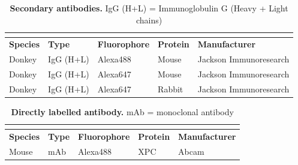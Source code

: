 \begin{table}[H]
	
\begin{center}
	\begin{tabular}{lllll}
		
		\multicolumn{5}{l}{} \\
		\hline
		\rule{0pt}{2ex}
		\textbf{Species}    &\textbf{Type} &\textbf{Fluorophore}& \textbf{Protein} & \textbf{Manufacturer} \\
		\hline
		
		Donkey & IgG (H+L) & Alexa488 & Mouse & Jackson Immunoresearch       \\
		Donkey & IgG (H+L) & Alexa647   & Mouse & Jackson Immunoresearch       \\
		Donkey & IgG (H+L) & Alexa647 & Rabbit& Jackson Immunoresearch       \\
		\hline
	\end{tabular}
	\caption{\textbf{Secondary antibodies.}  IgG (H+L) = Immunoglobulin G (Heavy + Light chains)}
	\label{tab:SecondaryAntibodies}
	\end{center}
\end{table}

\begin{table}[H]
\begin{center}
	\begin{tabular}{lllll}
		
		\multicolumn{5}{l}{} \\
		\hline
		\rule{0pt}{2ex}
		\textbf{Species}    &\textbf{Type} &\textbf{Fluorophore}& \textbf{Protein} & \textbf{Manufacturer} \\
		\hline
		Mouse & mAb & Alexa488 & XPC & Abcam       \\
		\hline
	\end{tabular}
	\caption{\textbf{Directly labelled antibody.}  mAb = monoclonal antibody}
	\label{tab:DirectlyLabeledAntibody}
	\end{center}
\end{table}

